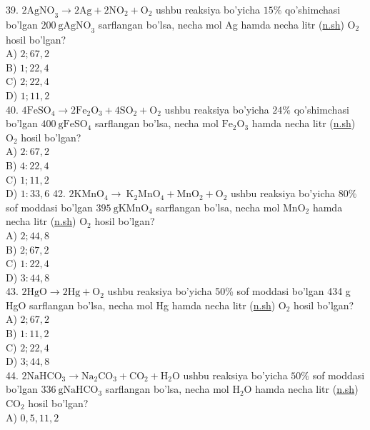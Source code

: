 39. $2 \mathrm{AgNO}_{3} \rightarrow 2 \mathrm{Ag}+2 \mathrm{NO}_{2}+\mathrm{O}_{2}$ ushbu reaksiya bo'yicha $15 \%$ qo'shimchasi bo'lgan $200 \mathrm{~g} \mathrm{AgNO}_{3}$ sarflangan bo'lsa, necha mol Ag hamda necha litr (\href{http://n.sh}{n.sh}) $\mathrm{O}_{2}$ hosil bo'lgan?\\
A) $2 ; 67,2$\\
B) $1 ; 22,4$\\
C) $2 ; 22,4$\\
D) $1 ; 11,2$\\
40. $4 \mathrm{FeSO}_{4} \rightarrow 2 \mathrm{Fe}_{2} \mathrm{O}_{3}+4 \mathrm{SO}_{2}+\mathrm{O}_{2}$ ushbu reaksiya bo'yicha $24 \%$ qo'shimchasi bo'lgan $400 \mathrm{~g} \mathrm{FeSO}_{4}$ sarflangan bo'lsa, necha mol $\mathrm{Fe}_{2} \mathrm{O}_{3}$ hamda necha litr (\href{http://n.sh}{n.sh}) $\mathrm{O}_{2}$ hosil bo'lgan?\\
A) $2: 67,2$\\
B) $4: 22,4$\\
C) $1 ; 11,2$\\
D) $1: 33,6$
42. $2 \mathrm{KMnO}_{4} \rightarrow \mathrm{~K}_{2} \mathrm{MnO}_{4}+\mathrm{MnO}_{2}+\mathrm{O}_{2}$ ushbu reaksiya bo'yicha $80 \%$ sof moddasi bo'lgan $395 \mathrm{~g} \mathrm{KMnO}_{4}$ sarflangan bo'lsa, necha mol $\mathrm{MnO}_{2}$ hamda necha litr (\href{http://n.sh}{n.sh}) $\mathrm{O}_{2}$ hosil bo'lgan?\\
A) $2 ; 44,8$\\
B) $2 ; 67,2$\\
C) $1: 22,4$\\
D) $3: 44,8$\\
43. $2 \mathrm{HgO} \rightarrow 2 \mathrm{Hg}+\mathrm{O}_{2}$ ushbu reaksiya bo'yicha 50\% sof moddasi bo'lgan 434 g HgO sarflangan bo'lsa, necha mol Hg hamda necha litr (\href{http://n.sh}{n.sh}) $\mathrm{O}_{2}$ hosil bo'lgan?\\
A) $2 ; 67,2$\\
B) $1: 11,2$\\
C) $2 ; 22,4$\\
D) $3 ; 44,8$\\
44. $2 \mathrm{NaHCO}_{3} \rightarrow \mathrm{Na}_{2} \mathrm{CO}_{3}+\mathrm{CO}_{2}+\mathrm{H}_{2} \mathrm{O}$ ushbu reaksiya bo'yicha $50 \%$ sof moddasi bo'lgan $336 \mathrm{~g} \mathrm{NaHCO}_{3}$ sarflangan bo'lsa, necha mol $\mathrm{H}_{2} \mathrm{O}$ hamda necha litr (\href{http://n.sh}{n.sh}) $\mathrm{CO}_{2}$ hosil bo'lgan?\\
A) $0,5,11,2$\\
